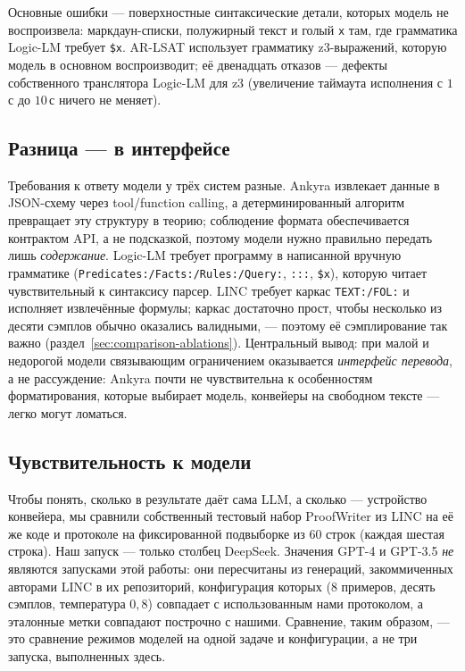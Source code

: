 \documentclass[11pt,a4paper]{article}
\begin{document}
Основные ошибки — поверхностные синтаксические детали, которых модель не воспроизвела: маркдаун-списки, полужирный текст и голый \texttt{x}
там, где грамматика Logic-LM требует \texttt{\$x}. AR-LSAT использует грамматику z3-выражений, которую модель в основном воспроизводит;
её двенадцать отказов — дефекты собственного транслятора Logic-LM для z3 (увеличение таймаута исполнения с $1$\,с до $10$\,с ничего не меняет).

\subsection{Разница — в интерфейсе}
\label{sec:comparison-interface}

Требования к ответу модели у трёх систем разные. Ankyra извлекает данные в JSON-схему через tool/function calling, а детерминированный
алгоритм превращает эту структуру в теорию; соблюдение формата обеспечивается контрактом API, а не подсказкой, поэтому модели нужно
правильно передать лишь \emph{содержание}. Logic-LM требует программу в написанной вручную грамматике
(\texttt{Predicates:/Facts:/Rules:/Query:}, \texttt{:::}, \texttt{\$x}), которую читает чувствительный к синтаксису парсер. LINC требует
каркас \texttt{TEXT:/FOL:} и исполняет извлечённые формулы; каркас достаточно прост, чтобы несколько из десяти сэмплов обычно оказались
валидными, — поэтому её сэмплирование так важно (раздел~\ref{sec:comparison-ablations}). Центральный вывод: при малой и недорогой модели
связывающим ограничением оказывается \emph{интерфейс перевода}, а не рассуждение: Ankyra почти не чувствительна к особенностям форматирования,
которые выбирает модель, конвейеры на свободном тексте — легко могут ломаться.

\subsection{Чувствительность к модели}
\label{sec:comparison-model}

Чтобы понять, сколько в результате даёт сама LLM, а сколько — устройство конвейера, мы сравнили собственный тестовый набор ProofWriter из
LINC на её же коде и протоколе на фиксированной подвыборке из 60 строк (каждая шестая строка). Наш запуск — только столбец DeepSeek.
Значения GPT-4 и GPT-3.5 \emph{не} являются запусками этой работы: они пересчитаны из генераций, закоммиченных авторами LINC в их
репозиторий, конфигурация которых (8 примеров, десять сэмплов, температура $0{,}8$) совпадает с использованным нами протоколом, а
эталонные метки совпадают построчно с нашими. Сравнение, таким образом, — это сравнение режимов моделей на одной задаче и конфигурации,
а не три запуска, выполненных здесь.
\end{document}
